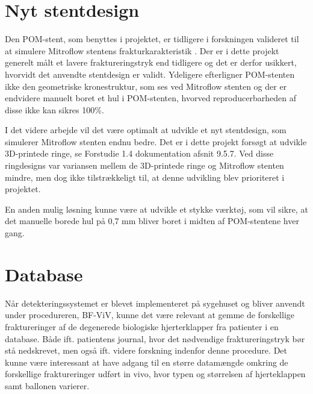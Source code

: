\section{Nyt stentdesign}
Den POM-stent, som benyttes i projektet, er tidligere i forskningen valideret til at simulere Mitroflow stentens frakturkarakteristik \cite{rapport}. Der er i dette projekt generelt målt et lavere fraktureringstryk end tidligere og det er derfor usikkert, hvorvidt det anvendte stentdesign er validt. Ydeligere efterligner POM-stenten ikke den geometriske kronestruktur, som ses ved Mitroflow stenten og der er endvidere manuelt boret et hul i POM-stenten, hvorved reproducerbarheden af disse ikke kan sikres 100\%.

I det videre arbejde vil det være optimalt at udvikle et nyt stentdesign, som simulerer Mitroflow stenten endnu bedre. Det er i dette projekt forsøgt at udvikle 3D-printede ringe, se Forstudie 1.4 dokumentation afsnit 9.5.7. Ved disse ringdesigns var variansen mellem de 3D-printede ringe og Mitroflow stenten mindre, men dog ikke tilstrækkeligt til, at denne udvikling blev prioriteret i projektet.

En anden mulig løsning kunne være at udvikle et stykke værktøj, som vil sikre, at det manuelle borede hul på 0,7 mm bliver boret i midten af POM-stentene hver gang.       

\section{Database}
Når detekteringssystemet er blevet implementeret på sygehuset og bliver anvendt under procedureren, BF-ViV, kunne det være relevant at gemme de forskellige fraktureringer af de degenerede biologiske hjerterklapper fra patienter i en database. Både ift. patientens journal, hvor det nødvendige fraktureringstryk bør stå nedskrevet, men også ift. videre forskning indenfor denne procedure. Det kunne være interessant at have adgang til en større datamængde omkring de forskellige fraktureringer udført in vivo, hvor typen og størrelsen af hjerteklappen samt ballonen varierer. 




























 

 




